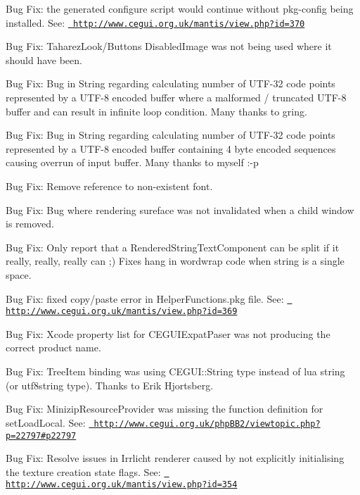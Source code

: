 \begin{DoxyItemize}
\item Bug Fix\+: the generated configure script would continue without pkg-\/config being installed. See\+: \href{http://www.cegui.org.uk/mantis/view.php?id=370}{\texttt{ http\+://www.\+cegui.\+org.\+uk/mantis/view.\+php?id=370}}
\item Bug Fix\+: Taharez\+Look/\+Button\textquotesingle{}s \textquotesingle{}Disabled\+Image\textquotesingle{} was not being used where it should have been.
\item Bug Fix\+: Bug in String regarding calculating number of U\+T\+F-\/32 code points represented by a U\+T\+F-\/8 encoded buffer where a malformed / truncated U\+T\+F-\/8 buffer and can result in infinite loop condition. Many thanks to gring.
\item Bug Fix\+: Bug in String regarding calculating number of U\+T\+F-\/32 code points represented by a U\+T\+F-\/8 encoded buffer containing 4 byte encoded sequences causing overrun of input buffer. Many thanks to myself \+:-\/p
\item Bug Fix\+: Remove reference to non-\/existent font.
\item Bug Fix\+: Bug where rendering sureface was not invalidated when a child window is removed.
\item Bug Fix\+: Only report that a Rendered\+String\+Text\+Component can be split if it really, really, really can ;) Fixes hang in wordwrap code when string is a single space.
\item Bug Fix\+: fixed copy/paste error in Helper\+Functions.\+pkg file. See\+: \href{http://www.cegui.org.uk/mantis/view.php?id=369}{\texttt{ http\+://www.\+cegui.\+org.\+uk/mantis/view.\+php?id=369}}
\item Bug Fix\+: Xcode property list for C\+E\+G\+U\+I\+Expat\+Paser was not producing the correct product name.
\item Bug Fix\+: Tree\+Item binding was using C\+E\+G\+U\+I\+::\+String type instead of lua string (or utf8string type). Thanks to Erik Hjortsberg.
\item Bug Fix\+: Minizip\+Resource\+Provider was missing the function definition for set\+Load\+Local. See\+: \href{http://www.cegui.org.uk/phpBB2/viewtopic.php?p=22797\#p22797}{\texttt{ http\+://www.\+cegui.\+org.\+uk/php\+B\+B2/viewtopic.\+php?p=22797\#p22797}}
\item Bug Fix\+: Resolve issues in Irrlicht renderer caused by not explicitly initialising the texture creation state flags. See\+: \href{http://www.cegui.org.uk/mantis/view.php?id=354}{\texttt{ http\+://www.\+cegui.\+org.\+uk/mantis/view.\+php?id=354}}

\end{DoxyItemize}
